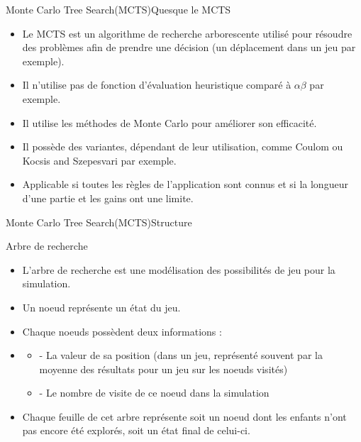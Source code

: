 \begin{frame}{Monte Carlo Tree Search(MCTS)}{Quesque le MCTS}
	\begin{block}{}
		\begin{itemize}
			\item Le MCTS est un algorithme de recherche arborescente utilisé pour résoudre des problèmes afin de prendre une décision (un déplacement dans un jeu par exemple).
			\item Il n'utilise pas de fonction d'évaluation heuristique comparé à $\alpha$$\beta$ par exemple.
			\item Il utilise les méthodes de Monte Carlo pour améliorer son efficacité.
			\item Il possède des variantes, dépendant de leur utilisation, comme Coulom ou Kocsis and Szepesvari par exemple.
			\item Applicable si toutes les règles de l'application sont connus et si la longueur d'une partie et les gains ont une limite.	
		\end{itemize}
	\end{block}
\end{frame}

\begin{frame}{Monte Carlo Tree Search(MCTS)}{Structure}
	\begin{block}{Arbre de recherche}
		\begin{itemize}
			\item L'arbre de recherche est une modélisation des possibilités de jeu pour la simulation.
			\item Un noeud représente un état du jeu.
			\item Chaque noeuds possèdent deux informations :
			\item\begin{itemize}
				\item - La valeur de sa position (dans un jeu, représenté souvent par la moyenne des résultats pour un jeu sur les noeuds visités)
				\item - Le nombre de visite de ce noeud dans la simulation
			\end{itemize}
			\item Chaque feuille de cet arbre représente soit un noeud dont les enfants n'ont pas encore été explorés, soit un état final de celui-ci.		
		\end{itemize}
	\end{block}
\end{frame}

